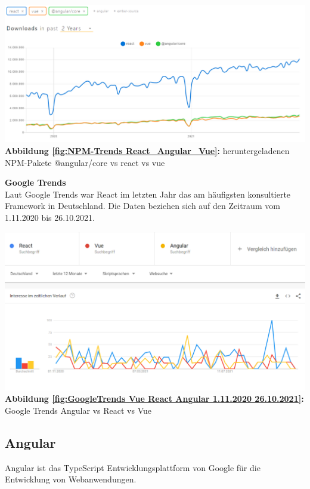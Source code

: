 \begin{center}
  \includegraphics[scale=0.5]{sources/NPM-Trends React_Angular_Vue}\label{fig:NPM-Trends React_Angular_Vue}\\
  \textbf{Abbildung \autoref{fig:NPM-Trends React_Angular_Vue}:} heruntergeladenen NPM-Pakete @angular/core vs react vs vue
  {\cite{NPM01}}
\end{center}

\textbf{Google Trends}\\
Laut Google Trends war React im letzten Jahr das am häufigsten konsultierte Framework in Deutschland. 
Die Daten beziehen sich auf den Zeitraum vom 1.11.2020 bis 26.10.2021.
\begin{center}
  \includegraphics[scale=0.5]{sources/GoogleTrends Vue React Angular 1.11.2020 26.10.2021}\label{fig:GoogleTrends Vue React Angular 1.11.2020 26.10.2021}\\
  \textbf{Abbildung \autoref{fig:GoogleTrends Vue React Angular 1.11.2020 26.10.2021}:} Google Trends Angular vs React vs Vue
  {\cite{GO01}}
\end{center}

\subsection{Angular}
Angular ist das TypeScript Entwicklungsplattform von Google für die Entwicklung von Webanwendungen. 

